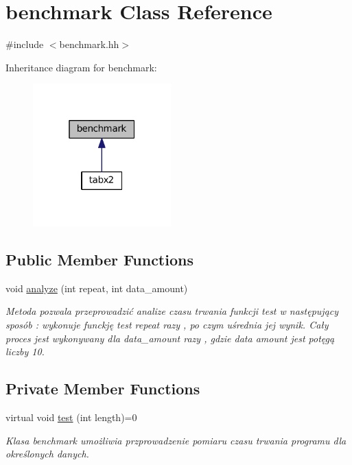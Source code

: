 \hypertarget{classbenchmark}{}\section{benchmark Class Reference}
\label{classbenchmark}


{\ttfamily \#include $<$benchmark.\+hh$>$}



Inheritance diagram for benchmark\+:\nopagebreak
\begin{figure}[H]
\begin{center}
\leavevmode
\includegraphics[width=151pt]{d3/d5c/classbenchmark__inherit__graph}
\end{center}
\end{figure}
\subsection*{Public Member Functions}
\begin{DoxyCompactItemize}
\item 
void \hyperlink{classbenchmark_a23e508cd746c10ba8a650965673aa839}{analyze} (int repeat, int data\+\_\+amount)
\begin{DoxyCompactList}\small\item\em Metoda pozwala przeprowadzić analize czasu trwania funkcji test w następujący sposób \+: wykonuje funckję test repeat razy , po czym uśrednia jej wynik. Cały proces jest wykonywany dla data\+\_\+amount razy , gdzie data amount jest potęgą liczby 10. \end{DoxyCompactList}\end{DoxyCompactItemize}
\subsection*{Private Member Functions}
\begin{DoxyCompactItemize}
\item 
virtual void \hyperlink{classbenchmark_a698d333f815e6e12c0817b1dfee56e99}{test} (int length)=0
\begin{DoxyCompactList}\small\item\em Klasa benchmark umożliwia przprowadzenie pomiaru czasu trwania programu dla określonych danych. \end{DoxyCompactList}\end{DoxyCompactItemize}


